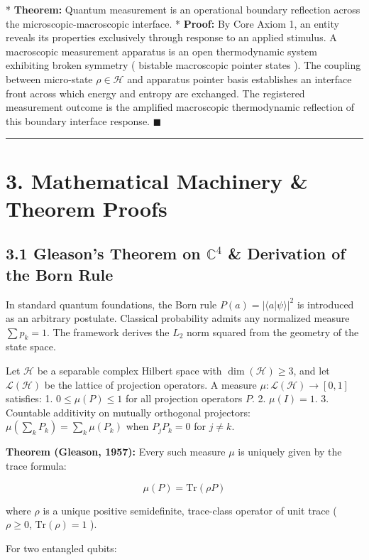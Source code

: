 \documentclass[11pt,a4paper]{article}
\theoremstyle{definition}\newtheorem{definition}{Definition}
\theoremstyle{remark}\newtheorem{remark}{Remark}
\begin{document}
* \textbf{Theorem:} Quantum measurement is an operational boundary reflection across the microscopic-macroscopic interface.
* \textbf{Proof:} By Core Axiom 1, an entity reveals its properties exclusively through response to an applied stimulus. A macroscopic measurement apparatus is an open thermodynamic system exhibiting broken symmetry ( bistable macroscopic pointer states ). The coupling between micro-state $\rho \in \mathcal{H}$ and apparatus pointer basis establishes an interface front across which energy and entropy are exchanged. The registered measurement outcome is the amplified macroscopic thermodynamic reflection of this boundary interface response. $\blacksquare$

\noindent\rule{\linewidth}{0.4pt}
\section{3. Mathematical Machinery \& Theorem Proofs}
\subsection{3.1 Gleason's Theorem on $\mathbb{C}^4$ \& Derivation of the Born Rule}

In standard quantum foundations, the Born rule $P(a) = |\langle a | \psi \rangle|^2$ is introduced as an arbitrary postulate. Classical probability admits any normalized measure $\sum p_k = 1$. The framework derives the $L_2$ norm squared from the geometry of the state space.

Let $\mathcal{H}$ be a separable complex Hilbert space with $\dim(\mathcal{H}) \ge 3$, and let $\mathcal{L}(\mathcal{H})$ be the lattice of projection operators. A measure $\mu: \mathcal{L}(\mathcal{H}) \to [0, 1]$ satisfies:
1. $0 \le \mu(P) \le 1$ for all projection operators $P$.
2. $\mu(I) = 1$.
3. Countable additivity on mutually orthogonal projectors: $\mu(\sum_k P_k) = \sum_k \mu(P_k)$ when $P_j P_k = 0$ for $j \neq k$.

\textbf{Theorem (Gleason, 1957):} Every such measure $\mu$ is uniquely given by the trace formula:


\begin{equation}
\mu(P) = \text{Tr}(\rho P)
\end{equation}


where $\rho$ is a unique positive semidefinite, trace-class operator of unit trace ( $\rho \ge 0$, $\text{Tr}(\rho) = 1$ ).

For two entangled qubits:
\end{document}
